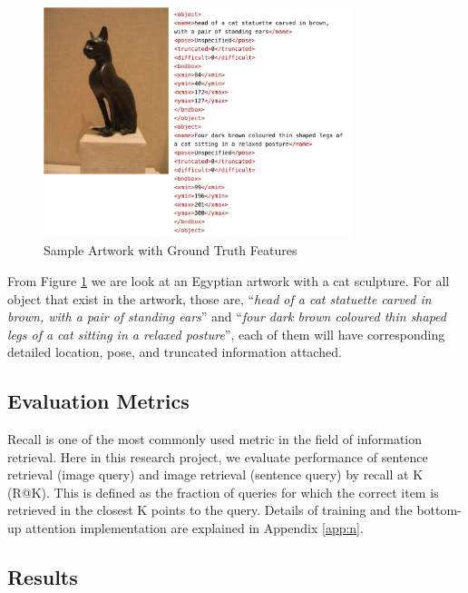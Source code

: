 \begin{figure}[h!]
\centering
\includegraphics[width=0.8\textwidth]{sampledata.pdf}
\caption{Sample Artwork with Ground Truth Features}
\label{fig:sampledata}
\end{figure}

From Figure \ref{fig:sampledata} we are look at an Egyptian artwork with a cat sculpture. For all object that exist in the artwork, those are, ``\textit{head of a	cat statuette carved in	brown, with	a pair of standing ears}'' and ``\textit{four dark brown coloured thin shaped legs of a cat sitting in a relaxed posture}'', each of them will have corresponding detailed location, pose, and truncated information attached. 

\subsection{Evaluation Metrics}

Recall is one of the most commonly used metric in the field of information retrieval. Here in this research project, we evaluate performance of sentence retrieval (image query) and image retrieval (sentence query) by recall at K (R@K). This is defined as the fraction of queries for which the correct item is retrieved in the closest K points to the query. Details of training and the bottom-up attention implementation are explained in Appendix \ref{app:n}.

\subsection{Results}

